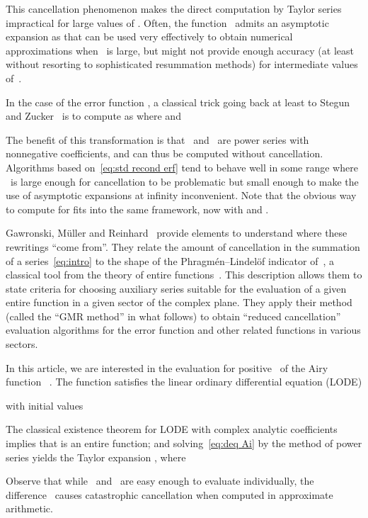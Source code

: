 \documentclass[10pt, conference]{IEEEtran}
\begin{document}
This cancellation phenomenon makes the direct
computation by Taylor series impractical for large values of .
Often, the function~ admits an asymptotic expansion as
{}
that can be used very effectively to obtain numerical approximations when~
is large, but might not provide enough accuracy (at least without resorting to sophisticated resummation methods) for intermediate values of~.

In the case of the error function , a
classical trick going back at least to Stegun and
Zucker~{\cite{StegunZucker1970}} is to compute 
as  where  and~{\cite[Eq.~7.6.2]{DLMF}}

The benefit of this transformation is that ~and~ are power series with
nonnegative coefficients, and can thus be computed without cancellation.
Algorithms based on~\eqref{eq:std recond erf} tend to behave well in some
range  where ~is large enough for cancellation to be problematic
but small enough to make the use of asymptotic expansions at infinity
inconvenient.
Note that the obvious way to compute  for  fits into the same framework, now with 
and .

Gawronski, M\"uller and
Reinhard~{\cite{GawronskiMullerReinhard2007,Reinhard2008}} provide elements to
understand where these rewritings ``come from''. They relate the amount of
cancellation in the summation of a series~\eqref{eq:intro} to the shape of the
Phragm\'en--Lindel\"of indicator of~, a classical tool from the theory of
entire functions~{\cite{Levin1996}}. This description allows them to state
criteria for choosing auxiliary series suitable for the evaluation of a given
entire function in a given sector of the complex plane. They apply their
method (called the ``GMR method'' in what follows) to obtain ``reduced
cancellation'' evaluation algorithms for the error function and other related
functions in various sectors.

In this article, we are interested in the evaluation for positive~ of the
Airy function ~\cite[Chap.~9]{DLMF}.
The function  satisfies the linear ordinary
differential equation (LODE)

with initial values

The classical existence theorem for LODE with complex analytic coefficients
implies that  is an entire function; and
solving~\eqref{eq:deq Ai} by the method of power series yields the Taylor
expansion , where

Observe that while ~and~ are easy enough to evaluate individually, the
difference~ causes catastrophic cancellation when computed in
approximate arithmetic.
\end{document}
